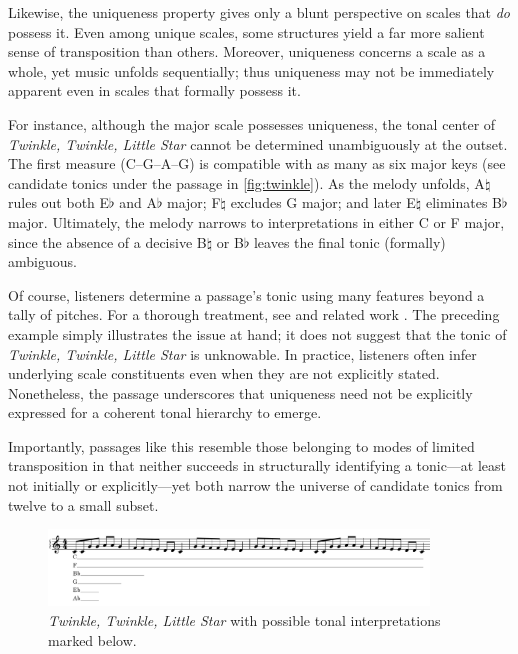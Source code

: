 \documentclass[10pt,twocolumn]{article}
\numberwithin{equation}{section} %
\begin{document}
    Likewise, the uniqueness property gives only a blunt perspective on scales that \emph{do} possess it.
    Even among unique scales, some structures yield a far more salient sense of transposition than others.
    Moreover, uniqueness concerns a scale as a whole, yet music unfolds sequentially; thus uniqueness may not be immediately apparent even in scales that formally possess it.

    For instance, although the major scale possesses uniqueness, the tonal center of \emph{Twinkle, Twinkle, Little Star} cannot be determined unambiguously at the outset.
    The first measure (C–G–A–G) is compatible with as many as six major keys (see candidate tonics under the passage in \autoref{fig:twinkle}).
    As the melody unfolds, A$\natural$ rules out both E$\flat$ and A$\flat$ major; F$\natural$ excludes G major; and later E$\natural$ eliminates B$\flat$ major.
    Ultimately, the melody narrows to interpretations in either C or F major, since the absence of a decisive B$\natural$ or B$\flat$ leaves the final tonic (formally) ambiguous.

    Of course, listeners determine a passage’s tonic using many features beyond a tally of pitches.
    For a thorough treatment, see \citet{LerdahlJackendoff1983} and related work \citep{BharuchaKrumhansl1983,Lerdahl2004,Patel1998,Thompson1997}.
    The preceding example simply illustrates the issue at hand; it does not suggest that the tonic of \emph{Twinkle, Twinkle, Little Star} is unknowable.
    In practice, listeners often infer underlying scale constituents even when they are not explicitly stated.
    Nonetheless, the passage underscores that uniqueness need not be explicitly expressed for a coherent tonal hierarchy to emerge.

    Importantly, passages like this resemble those belonging to modes of limited transposition in that neither succeeds in structurally identifying a tonic—at least not initially or explicitly—yet both narrow the universe of candidate tonics from twelve to a small subset.

    \begin{figure}[htbp]
        \centering
        \includegraphics[width=0.9\textwidth]{figures/twinkle}%
        \caption{\emph{Twinkle, Twinkle, Little Star} with possible tonal interpretations marked below.}
        \label{fig:twinkle}
    \end{figure}
\end{document}
